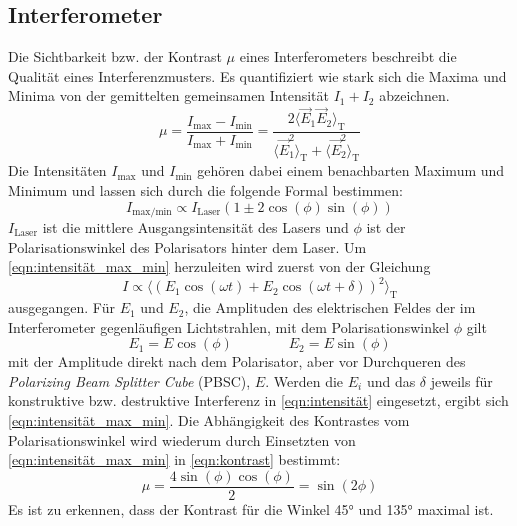     \subsection{Interferometer}
        Die Sichtbarkeit bzw. der Kontrast $\mu$ eines Interferometers \cite{hecht_optik_2018} beschreibt die Qualität eines Interferenzmusters.
        Es quantifiziert wie stark sich die Maxima und Minima von der gemittelten gemeinsamen Intensität $I_1 + I_2$ abzeichnen.
        \begin{equation}
            \mu = \frac{I_{\text{max}} - I_{\text{min}}}{I_{\text{max}} + I_{\text{min}}} = \frac{2\langle\vec{E}_1\vec{E}_2\rangle_{\text{T}}}{\langle\vec{E}^2_1\rangle_{\text{T}} + \langle\vec{E}^2_2\rangle_{\text{T}}}
            \label{eqn:kontrast}
        \end{equation}
        Die Intensitäten $I_{\text{max}}$ und $I_{\text{min}}$ gehören dabei einem benachbarten Maximum und Minimum und lassen sich durch die folgende Formal bestimmen:
        \begin{equation}
            I_{\text{max/min}} \propto I_{\text{Laser}} \left(1 \pm 2 \cos(\phi)\sin(\phi)\right)
            \label{eqn:intensität_max_min}
        \end{equation}
        $I_{\text{Laser}}$ ist die mittlere Ausgangsintensität des Lasers und $\phi$ ist der Polarisationswinkel des Polarisators hinter dem Laser.
        Um \eqref{eqn:intensität_max_min} herzuleiten wird zuerst von der Gleichung
        \begin{equation}
            I \propto \langle\left(E_1 \cos(\omega t) + E_2 \cos(\omega t + \delta)\right)^2\rangle_{\text{T}}
            \label{eqn:intensität}
        \end{equation}
        ausgegangen. Für $E_1$ und $E_2$, die Amplituden des elektrischen Feldes der im Interferometer gegenläufigen Lichtstrahlen, mit dem Polarisationswinkel $\phi$ gilt
        \begin{equation*}
            E_1 = E \cos(\phi) \qquad \qquad E_2 = E \sin(\phi)
        \end{equation*}
        mit der Amplitude direkt nach dem Polarisator, aber vor Durchqueren des \textit{Polarizing Beam Splitter Cube} (PBSC), $E$.
        Werden die $E_i$ und das $\delta$ jeweils für konstruktive bzw. destruktive Interferenz in \eqref{eqn:intensität} eingesetzt, ergibt sich \eqref{eqn:intensität_max_min}.
        Die Abhängigkeit des Kontrastes vom Polarisationswinkel wird wiederum durch Einsetzten von \eqref{eqn:intensität_max_min} in \eqref{eqn:kontrast} bestimmt:
        \begin{equation*}
            \mu = \frac{4\sin(\phi)\cos(\phi)}{2} = \sin(2\phi)
        \end{equation*}
        Es ist zu erkennen, dass der Kontrast für die Winkel 45° und 135° maximal ist.

